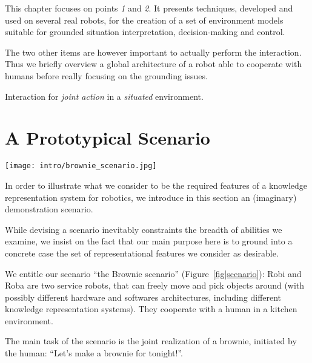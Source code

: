 This chapter focuses on points {\it 1} and {\it 2}. It presents techniques,
developed and used on several real robots, for the creation of a set of
environment models suitable for grounded situation interpretation,
decision-making and control.

The two other items are however important to actually perform the interaction.
Thus we briefly overview a global architecture of a robot able to cooperate
with humans before really focusing on the grounding issues.




Interaction for \emph{joint action} in a \emph{situated} environment.


\section{A Prototypical Scenario}
\label{sect|scenario}

\begin{figure*}
	\centering
	\texttt{[image: intro/brownie\_scenario.jpg]}
	\caption{A representation of the scenario, in the MORSE simulator}
	\label{fig|scenario}
\end{figure*}

In order to illustrate what we consider to be the required features of a
knowledge representation system for robotics, we introduce in this section an
(imaginary) demonstration scenario.

While devising a scenario inevitably constraints the breadth of abilities we
examine, we insist on the fact that our main purpose here is to ground into a
concrete case the set of representational features we consider as desirable.

We entitle our scenario ``the Brownie scenario'' (Figure~\ref{fig|scenario}):
Robi and Roba are two service robots, that can freely
move and pick objects around (with possibly different hardware and softwares
architectures, including different knowledge representation systems). They
cooperate with a human in a kitchen environment.

The main task of the scenario is the joint realization of a brownie, initiated
by the human: ``Let's make a brownie for tonight!''.

